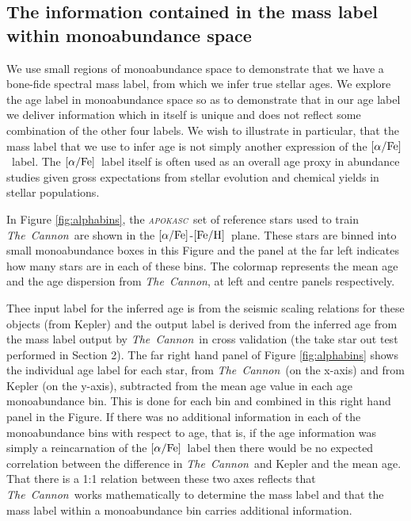 \documentclass[12pt, preprint]{aastex}
\newcommand{\project}[1]{\textsl{#1}}
\newcommand{\tc}{\project{The~Cannon}}
\newcommand{\apokasc}{\project{\textsc{apokasc}}}
\newcommand{\feh}{\mbox{$\rm [Fe/H]$}}
\newcommand{\alphafe}{\mbox{$\rm [\alpha/Fe]$}}
\begin{document}


\subsection{The information contained in the mass label within monoabundance space}

We use small regions of monoabundance space to demonstrate that we have a bone-fide spectral mass label, from which we infer true stellar ages. We explore the age label in monoabundance space so as to demonstrate that in our age label we deliver information which in itself is unique and does not reflect some combination of the other four labels. We wish to illustrate in particular, that the mass label that we use to infer age is not simply another expression of the \alphafe\ label. The \alphafe\ label itself is often used as an overall age proxy in abundance studies given gross expectations from stellar evolution and chemical yields in stellar populations. 

In Figure \ref{fig:alphabins}, the \apokasc\ set of reference stars used to train \tc\ are shown in the \alphafe-\feh\ plane. These stars are binned into small monoabundance boxes in this Figure and the panel at the far left indicates how many stars are in each of these bins. The colormap represents the mean age and the age dispersion from \tc, at left and centre panels respectively. 

Thee input label for the inferred age is from the seismic scaling relations for these objects (from Kepler) and the output label is derived from the inferred age from the mass label output by \tc\ in cross validation (the take star out test performed in Section 2). The far right hand panel of Figure \ref{fig:alphabins} shows the individual age label for each star, from \tc\ (on the x-axis) and from Kepler (on the y-axis), subtracted from the mean age value in each age monoabundance bin. This is done for each bin and combined in this right hand panel in the Figure. If there was no additional information in each of the monoabundance bins with respect to age, that is, if the age information was simply a reincarnation of the \alphafe\ label then there would be no expected correlation between the difference in \tc\ and Kepler and the mean age. That there is a 1:1 relation between these two axes reflects that \tc\ works mathematically to determine the mass label and that the mass label within a monoabundance bin carries additional information.
\end{document}
